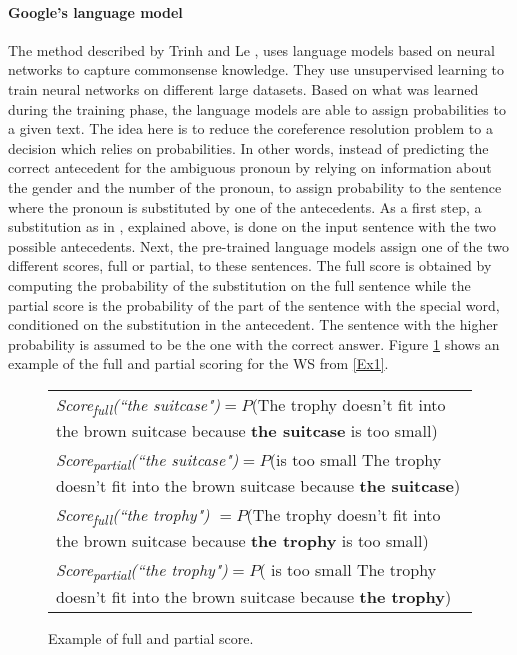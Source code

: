 \paragraph{Google’s language model}
The method described by Trinh and Le \cite{DBLP:journals/corr/abs-1806-02847}, uses language models based on neural networks to capture commonsense knowledge. They use unsupervised learning to train neural networks on different large datasets. Based on what was learned during the training phase, the language models are able to assign probabilities to a given text. The idea here is to reduce the coreference resolution problem to a decision which relies on probabilities. In other words, instead of predicting the correct antecedent for the ambiguous pronoun by relying on information about the gender and the number of the pronoun, to assign probability to the sentence where the pronoun is substituted by one of the antecedents. 
As a first step, a substitution as in \cite{W18-4105}, explained above, is done on the input sentence with the two possible antecedents. Next, the pre-trained language models assign one of the two different scores, full or partial, to these sentences. The full score is obtained by computing the probability of the substitution on the full sentence while the partial score is the probability of the part of the sentence with the special word, conditioned on the substitution in the antecedent. The sentence with the higher probability is assumed to be the one with the correct answer. Figure \ref{score} shows an example of the full and partial scoring for the WS from \ref{Ex1}. \\

\begin{figure} [h!]
	\small
	\begin{tabularx}{\textwidth}{X}
		\hline
		\textit{Score\textsubscript{full}(``the suitcase")}$=P$(The trophy doesn't fit into the brown suitcase because \textbf{the suitcase} is too small)\\ 
		\textit{Score\textsubscript{partial}(``the suitcase")}$=P$(is too small \textbar The trophy doesn't fit into the brown suitcase because \textbf{the suitcase})\\ \hline
		\textit{Score\textsubscript{full}(``the trophy") }$=P$(The trophy doesn't fit into the brown suitcase because \textbf{the trophy} is too small)\\ 
		\textit{Score\textsubscript{partial}(``the trophy")}$=P$( is too small \textbar The trophy doesn't fit into the brown suitcase because \textbf{the trophy})\\
		\hline
	\end{tabularx}
	
	\caption{{\label{score}}Example of full and partial score.}
\end{figure}

